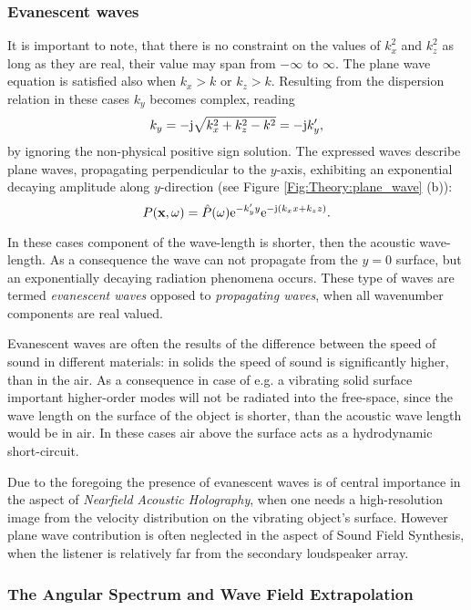 \subsubsection{Evanescent waves}
It is important to note, that there is no constraint on the values of $k_x^2$ and $k_z^2$ as long as they are real, their value may span from $-\infty$ to $\infty$. The plane wave equation is satisfied also when $k_x>k$ or $k_z>k$. Resulting from the dispersion relation in these cases $k_y$ becomes complex, reading
\begin{equation}
k_y = -\mathrm{j} \sqrt{ k_x^2 + k_z^2 - k^2 }=-\mathrm{j} k_y',
\end{equation}
by ignoring the non-physical positive sign solution.
The expressed waves describe plane waves, propagating perpendicular to the $y$-axis, exhibiting an exponential decaying amplitude along $y$-direction (see Figure \ref{Fig:Theory:plane_wave} (b)):
\begin{equation}
P(\mathbf{x},\omega) = \hat{P}(\omega) \mathrm{e}^{-k_y' y} \mathrm{e}^{-\mathrm{j} \left( k_x x + k_z z \right) }.
\end{equation}

In these cases component of the wave-length is shorter, then the acoustic wave-length. As a consequence the wave can not propagate from the $y = 0$ surface, but an exponentially decaying radiation phenomena occurs. These type of waves are termed \emph{evanescent waves} opposed to \emph{propagating waves}, when all wavenumber components are real valued.

Evanescent waves are often the results of the difference between the speed of sound in different materials: in solids the speed of sound is significantly higher, than in the air. As a consequence in case of e.g. a vibrating solid surface important higher-order modes will not be radiated into the free-space, since the wave length on the surface of the object is shorter, than the acoustic wave length would be in air. In these cases air above the surface acts as a hydrodynamic short-circuit.

Due to the foregoing the presence of evanescent waves is of central importance in the aspect of \emph{Nearfield Acoustic Holography}, when one needs a high-resolution image from the velocity distribution on the vibrating object's surface.
However plane wave contribution is often neglected in the aspect of Sound Field Synthesis, when the listener is relatively far from the secondary loudspeaker array.


\subsubsection{The Angular Spectrum and Wave Field Extrapolation}

